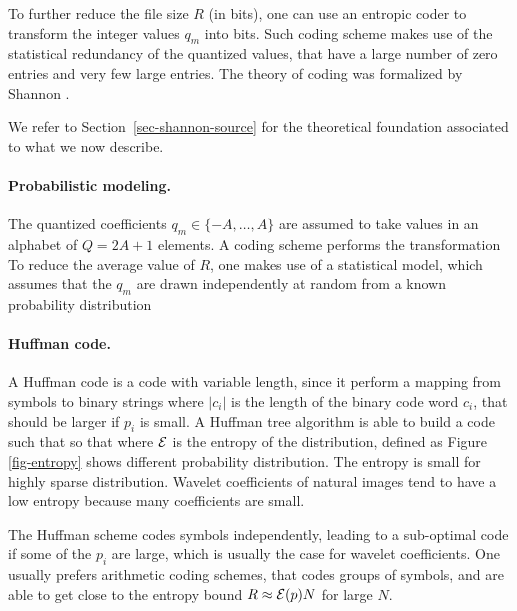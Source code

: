 To further reduce the file size $R$ (in bits), one can use an entropic coder to transform the integer values $q_m$ into bits. 
Such coding scheme makes use of the statistical redundancy of the quantized values, that have a large number of zero entries and very few large entries. The theory of coding was formalized by Shannon \cite{shannon-information}.

We refer to Section~\ref{sec-shannon-source} for the theoretical foundation associated to what we now describe. 


\paragraph{Probabilistic modeling.}

The quantized coefficients $q_m \in \{-A,\ldots,A\}$ are assumed to take values in an alphabet of $Q=2A+1$ elements.
A coding scheme performs the transformation 
To reduce the average value of $R$, one makes use of a statistical model, which assumes that the $q_m$ are drawn independently at random from a known probability distribution

\paragraph{Huffman code.}

A Huffman code is a code with variable length, since it perform a mapping from symbols to binary strings
where $|c_i|$ is the length of the binary code word $c_i$, that should be larger if $p_i$ is small. 
A Huffman tree algorithm is able to build a code such that 
so that 
where $\mathcal{E}$ is the entropy of the distribution, defined as
Figure \ref{fig-entropy} shows different probability distribution. The entropy is small for highly sparse distribution. Wavelet coefficients of natural images tend to have a low entropy because many coefficients are small.

The Huffman scheme codes symbols independently, leading to a sub-optimal code if some of the $p_i$ are large, which is usually the case for wavelet coefficients. One usually prefers arithmetic coding schemes, that codes groups of symbols, and are able to get close to the entropy bound $R \approx \mathcal{E}(p) N$ for large $N$.

